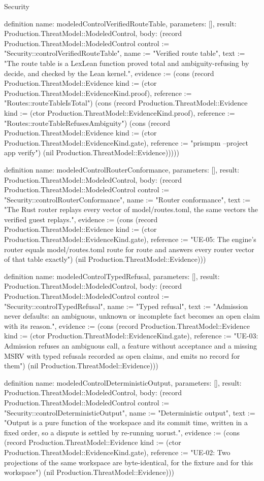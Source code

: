 \begin{lexlean}{Security}
\begin{semanticmodule}
{definition{
  name: modeledControlVerifiedRouteTable,
  parameters: [],
  result: Production.ThreatModel::ModeledControl,
  body: (record Production.ThreatModel::ModeledControl {control := "Security::controlVerifiedRouteTable", name := "Verified route table", text := "The route table is a LexLean function proved total and ambiguity-refusing by decide, and checked by the Lean kernel.", evidence := (cons (record Production.ThreatModel::Evidence {kind := (ctor Production.ThreatModel::EvidenceKind.proof), reference := "Routes::routeTableIsTotal"}) (cons (record Production.ThreatModel::Evidence {kind := (ctor Production.ThreatModel::EvidenceKind.proof), reference := "Routes::routeTableRefusesAmbiguity"}) (cons (record Production.ThreatModel::Evidence {kind := (ctor Production.ThreatModel::EvidenceKind.gate), reference := "prismpm --project app verify"}) (nil Production.ThreatModel::Evidence))))})
}

definition{
  name: modeledControlRouterConformance,
  parameters: [],
  result: Production.ThreatModel::ModeledControl,
  body: (record Production.ThreatModel::ModeledControl {control := "Security::controlRouterConformance", name := "Router conformance", text := "The Rust router replays every vector of model/routes.toml, the same vectors the verified guest replays.", evidence := (cons (record Production.ThreatModel::Evidence {kind := (ctor Production.ThreatModel::EvidenceKind.gate), reference := "UE-05: The engine's router equals model/routes.toml route for route and answers every router vector of that table exactly"}) (nil Production.ThreatModel::Evidence))})
}

definition{
  name: modeledControlTypedRefusal,
  parameters: [],
  result: Production.ThreatModel::ModeledControl,
  body: (record Production.ThreatModel::ModeledControl {control := "Security::controlTypedRefusal", name := "Typed refusal", text := "Admission never defaults: an ambiguous, unknown or incomplete fact becomes an open claim with its reason.", evidence := (cons (record Production.ThreatModel::Evidence {kind := (ctor Production.ThreatModel::EvidenceKind.gate), reference := "UE-03: Admission refuses an ambiguous call, a feature without acceptance and a missing MSRV with typed refusals recorded as open claims, and emits no record for them"}) (nil Production.ThreatModel::Evidence))})
}

definition{
  name: modeledControlDeterministicOutput,
  parameters: [],
  result: Production.ThreatModel::ModeledControl,
  body: (record Production.ThreatModel::ModeledControl {control := "Security::controlDeterministicOutput", name := "Deterministic output", text := "Output is a pure function of the workspace and its commit time, written in a fixed order, so a dispute is settled by re-running uorust.", evidence := (cons (record Production.ThreatModel::Evidence {kind := (ctor Production.ThreatModel::EvidenceKind.gate), reference := "UE-02: Two projections of the same workspace are byte-identical, for the fixture and for this workspace"}) (nil Production.ThreatModel::Evidence))})
}

}
\end{semanticmodule}
\end{lexlean}
